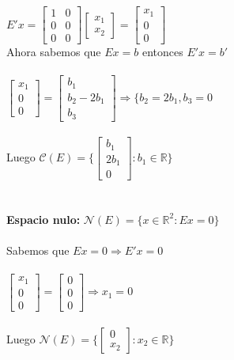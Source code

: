 \documentclass{article}
\begin{document}
$
E'x =
\begin{bmatrix}
1 & 0 \\
0 & 0 \\
0 & 0
\end{bmatrix}
\begin{bmatrix}
x_1 \\
x_2
\end{bmatrix} = 
\begin{bmatrix}
x_1 \\
0 \\
0
\end{bmatrix}
$ \\
Ahora sabemos que $Ex = b$ entonces $E'x = b'$ \\ \\
$
\begin{bmatrix}
x_1 \\
0 \\
0
\end{bmatrix} =
\begin{bmatrix}
b_1 \\
b_2 - 2b_1 \\
b_3
\end{bmatrix} \Rightarrow \Bigg \lbrace b_2 = 2b_1, b_3 = 0
$ \\ \\
Luego $\mathcal{C}(E) = \Bigg\lbrace \begin{bmatrix} b_1 \\ 2b_1 \\ 0 \end{bmatrix}:  b_1 \in \mathbb{R}  \Bigg\rbrace$ \\ \\ \\
\textbf{Espacio nulo: } 
$\mathcal{N}(E) = \Bigg\lbrace x \in \mathbb{R}^2: Ex = 0 \Bigg\rbrace$ \\ \\
Sabemos que $Ex = 0 \Rightarrow E'x = 0$ \\ \\
$
\begin{bmatrix}
x_1 \\
0 \\
0
\end{bmatrix} =
\begin{bmatrix}
0 \\
0 \\
0
\end{bmatrix} \Rightarrow x_1 = 0
$ \\ \\
Luego $\mathcal{N}(E) = \Bigg\lbrace \begin{bmatrix} 0 \\ x_2 \end{bmatrix} : x_2 \in \mathbb{R} \Bigg\rbrace$
\end{document}
